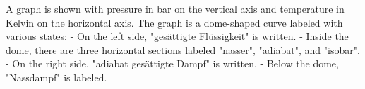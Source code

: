 A graph is shown with pressure in bar on the vertical axis and temperature in Kelvin on the horizontal axis. The graph is a dome-shaped curve labeled with various states: 
- On the left side, "gesättigte Flüssigkeit" is written.
- Inside the dome, there are three horizontal sections labeled "nasser", "adiabat", and "isobar".
- On the right side, "adiabat gesättigte Dampf" is written.
- Below the dome, "Nassdampf" is labeled.